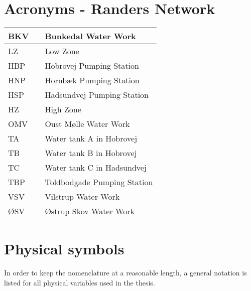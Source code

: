 \section*{Acronyms - Randers Network}
	
	\begin{tabular}{|l c l|} \hline
		BKV     &&	Bunkedal Water Work 									\\ \hline
		LZ      &&	Low Zone												\\ \hline
		HBP     &&	Hobrovej Pumping Station 								\\ \hline
		HNP     &&	Hornbæk Pumping Station 								\\ \hline
		HSP 	&&	Hadsundvej Pumping Station 								\\ \hline		
		HZ      &&	High Zone												\\ \hline
		OMV		&&	Oust Mølle Water Work 									\\ \hline
		TA 		&&	Water tank A in Hobrovej 								\\ \hline
		TB 		&&	Water tank B in Hobrovej 								\\ \hline
		TC 		&&	Water tank C in Hadsundvej 								\\ \hline
		TBP 	&&	Toldbodgade Pumping Station 							\\ \hline
		VSV 	&&	Vilstrup Water Work 									\\ \hline
		ØSV 	&&	Østrup Skov Water Work 									\\ \hline
	\end{tabular}

\newpage

\section*{Physical symbols}

In order to keep the nomenclature at a reasonable length, a general notation is listed for all physical variables used in the thesis. 

